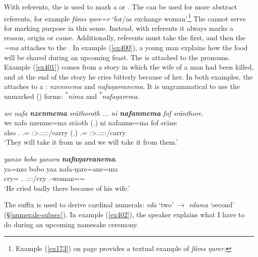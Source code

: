 With  referents, the  is used to mark a  or . The   can be used for more abstract  referents, for example \emph{fäms ŋare=r} `for/as exchange woman'.\footnote{Example (\ref{ex173}) on page \pageref{ex173} provides a textual example of \emph{fäms ŋarer}.} The   cannot serve for marking purpose in this sense. Instead, with  referents it always marks a reason, origin or cause. Additionally,  referents must take the   first, and then the  \emph{=ma} attaches to the . In example (\ref{ex400}), a young man explains how the food will be shared during an upcoming feast. The  is attached to the  pronouns. Example (\ref{ex401}) comes from a story in which the wife of a man had been killed, and at the end of the story he cries bitterly because of her. In both examples, the   attaches to a : \emph{nzenmema} and \emph{nafaŋareanema}. It is ungrammatical to use the unmarked () forms: \textsuperscript{$\ast$}\emph{nima} and \textsuperscript{$\ast$}\emph{nafaŋarema}.

\begin{exe}
	\ex \emph{we nafa \textbf{nzenmema} sräthoroth ... ni \textbf{nafanmema} fof sränthore.}\\
	\gll we nafa nzenme=ma sräoth (.) ni nafanme=ma fof sräne\\
	also \Tnsg.{\Erg} \Fnsg.\Poss={\Char} \Pl:\Sbj>\Tsg.\Masc:\Obj:\Irr:\Pfv:\Andat/carry (.) {\Fnsg} \Tnsg.\Poss={\Char} {\Emph} \Fpl:\Sbj>\Tsg.\Masc:\Obj:\Irr:\Pfv:\Venit/carry\\
	\trans `They will take it from us and we will take it from them.'
	\label{ex400}
\end{exe}
\begin{exe}
	\ex \emph{yanzo bobo yanora \textbf{nafaŋareanema}.}\\
	\gll ya=nzo bobo yaa nafa-ŋare=ane=ma\\
	cry={\Only} \Med.{\All} \Tsg.\Masc:\Sbj:\Pst:\Ipfv/cry \Third.\Poss-woman=\Poss=\Char\\
	\trans `He cried badly there because of his wife.'
	\label{ex401}
\end{exe}

The  suffix is used to derive cardinal numerals: \emph{eda} `two' $\rightarrow$ \emph{edama} `second' (\S\ref{numerals-subsec}). In example (\ref{ex402}), the speaker explains what I have to do during an upcoming namesake ceremony.


